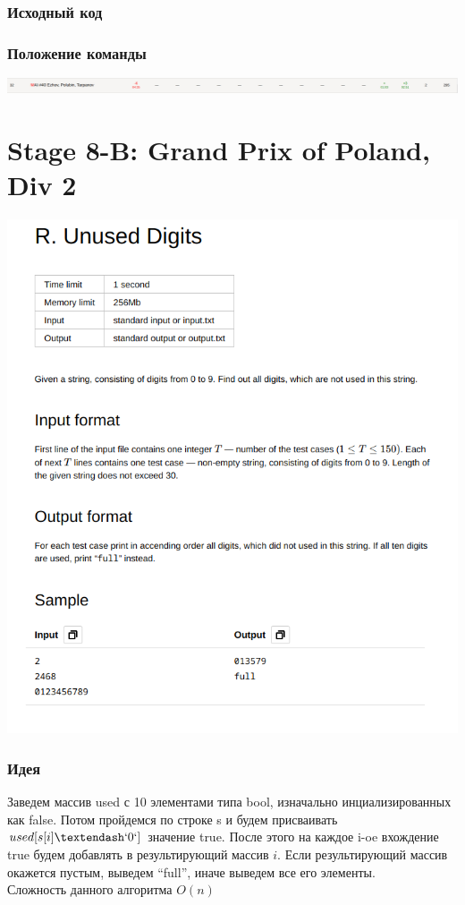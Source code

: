 \documentclass[12pt]{article}
\begin{document}
\subsubsection*{Исходный код}

\subsubsection*{Положение команды}
\includegraphics[scale=0.25]{images/7.png}\newline\noindent


\pagebreak
\section{Stage 8-B: Grand Prix of Poland, Div 2}
\includegraphics[scale=0.75]{statements/8_R.png}
\subsubsection*{Идея}
Заведем массив used с 10 элементами типа bool, изначально инциализированных как false. Потом пройдемся по строке s и будем присваивать 
$used[s[i] – `0`]$ значение true. После этого на каждое i-oe вхождение true будем добавлять в результирующий массив $i$. Если результирующий 
массив окажется пустым, выведем “full”, иначе выведем все его элементы.
\\ 
Сложность данного алгоритма $O(n)$
\end{document}
